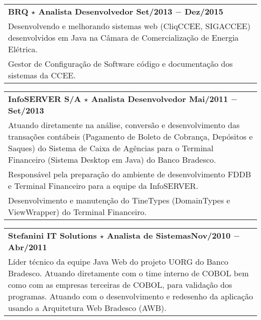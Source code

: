 \documentclass[a4paper, oneside, final]{scrartcl}
\newcommand{\vspc}{\vspace{0.15cm}} %
\begin{document}
\begin{center}
\begin{tabularx}{1\linewidth}{X}
{\bf BRQ $\star$ Analista Desenvolvedor \hfill Set/2013 $-$ Dez/2015} \\
Desenvolvendo e melhorando sistemas web (CliqCCEE, SIGACCEE) desenvolvidos em Java na Câmara de Comercialização de Energia Elétrica. \vspc\\
Gestor de Configuração de Software código e documentação dos sistemas da CCEE. \vspc\\
\end{tabularx}

\begin{tabularx}{1\linewidth}{X}
{\bf InfoSERVER S/A $\star$ Analista Desenvolvedor \hfill Mai/2011 $-$ Set/2013} \\
Atuando diretamente na análise, conversão e desenvolvimento das transações contábeis (Pagamento de
Boleto de Cobrança, Depósitos e Saques) do Sistema de Caixa de Agências para o Terminal Financeiro (Sistema
Desktop em Java) do Banco Bradesco.\vspc\\
Responsável pela preparação do ambiente de desenvolvimento FDDB e Terminal Financeiro para a equipe da
InfoSERVER. \vspc\\
Desenvolvimento e manutenção do TineTypes (DomainTypes e ViewWrapper) do Terminal Financeiro.  \vspc\\
\end{tabularx}

\begin{tabularx}{1\linewidth}{X}
{\bf Stefanini IT Solutions $\star$ Analista de Sistemas\hfill Nov/2010 $-$ Abr/2011} \\
Líder técnico da equipe Java Web do projeto UORG do Banco Bradesco. Atuando diretamente com o time
interno de COBOL bem como com as empresas terceiras de COBOL, para validação dos programas. Atuando
com o desenvolvimento e redesenho da aplicação usando a Arquitetura Web Bradesco (AWB).\vspc\\
\end{tabularx}


\end{center}
\end{document}
